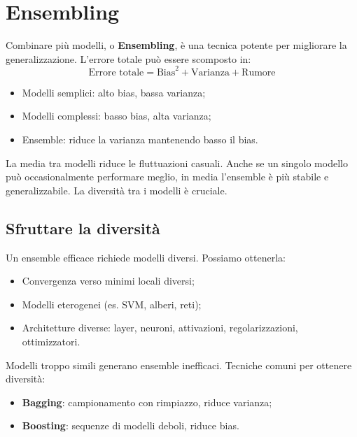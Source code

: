 \section{Ensembling}

Combinare più modelli, o \textbf{Ensembling}, è una tecnica potente per migliorare la generalizzazione. L’errore totale può essere scomposto in:
\[
\text{Errore totale} = \text{Bias}^2 + \text{Varianza} + \text{Rumore}
\]

\begin{itemize}
  \item Modelli semplici: alto bias, bassa varianza;
  \item Modelli complessi: basso bias, alta varianza;
  \item Ensemble: riduce la varianza mantenendo basso il bias.
\end{itemize}

La media tra modelli riduce le fluttuazioni casuali. Anche se un singolo modello può occasionalmente performare meglio, in media l’ensemble è più stabile e generalizzabile. La diversità tra i modelli è cruciale.

\subsection{Sfruttare la diversità}

Un ensemble efficace richiede modelli diversi. Possiamo ottenerla:
\begin{itemize}
  \item Convergenza verso minimi locali diversi;
  \item Modelli eterogenei (es. SVM, alberi, reti);
  \item Architetture diverse: layer, neuroni, attivazioni, regolarizzazioni, ottimizzatori.
\end{itemize}

Modelli troppo simili generano ensemble inefficaci. Tecniche comuni per ottenere diversità:
\begin{itemize}
  \item \textbf{Bagging}: campionamento con rimpiazzo, riduce varianza;
  \item \textbf{Boosting}: sequenze di modelli deboli, riduce bias.
\end{itemize}

